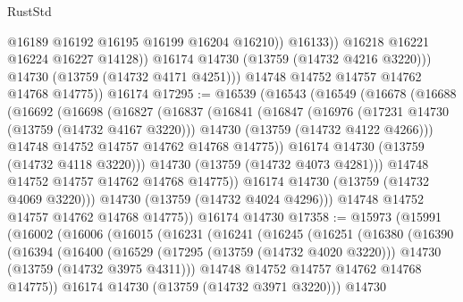 \begin{lexlean}{RustStd}
\begin{coremodule}
                        @16189
                        @16192
                        @16195
                        @16199
                        @16204
                        @16210))
                    @16133))
                @16218
                @16221
                @16224
                @16227
                @14128))
            @16174
            @14730
            (@13759 (@14732 @4216 @3220)))
          @14730
          (@13759 (@14732 @4171 @4251)))
        @14748
        @14752
        @14757
        @14762
        @14768
        @14775))
    @16174
@17295 := @16539
    (@16543
      (@16549
        (@16678
          (@16688
            (@16692
              (@16698
                (@16827
                  (@16837
                    (@16841
                      (@16847
                        (@16976
                          (@17231 @14730 (@13759 (@14732 @4167 @3220)))
                          @14730
                          (@13759 (@14732 @4122 @4266)))
                        @14748
                        @14752
                        @14757
                        @14762
                        @14768
                        @14775))
                    @16174
                    @14730
                    (@13759 (@14732 @4118 @3220)))
                  @14730
                  (@13759 (@14732 @4073 @4281)))
                @14748
                @14752
                @14757
                @14762
                @14768
                @14775))
            @16174
            @14730
            (@13759 (@14732 @4069 @3220)))
          @14730
          (@13759 (@14732 @4024 @4296)))
        @14748
        @14752
        @14757
        @14762
        @14768
        @14775))
    @16174
    @14730
@17358 := @15973
    (@15991
      (@16002
        (@16006
          (@16015
            (@16231
              (@16241
                (@16245
                  (@16251
                    (@16380
                      (@16390
                        (@16394
                          (@16400
                            (@16529
                              (@17295 (@13759 (@14732 @4020 @3220)))
                              @14730
                              (@13759 (@14732 @3975 @4311)))
                            @14748
                            @14752
                            @14757
                            @14762
                            @14768
                            @14775))
                        @16174
                        @14730
                        (@13759 (@14732 @3971 @3220)))
                      @14730

\end{coremodule}
\end{lexlean}
